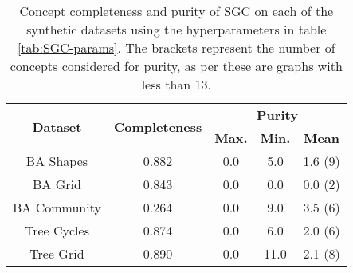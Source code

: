 \begin{table}
    \centering
    \begin{tabular}{c|cccc}
        \multirow{2}{*}{\textbf{Dataset}} &
        \multirow{2}{*}{\textbf{Completeness}} &
        \multicolumn{3}{c}{\textbf{Purity}} \\
        & & \textbf{Max.} & \textbf{Min.} & \textbf{Mean} \\
        \midrule
        BA Shapes       & 0.882 & 0.0 & 5.0 & 1.6 (9)\\
        BA Grid         & 0.843 & 0.0 & 0.0 & 0.0 (2) \\
        BA Community    & 0.264 & 0.0 & 9.0 & 3.5 (6)  \\
        Tree Cycles     & 0.874 & 0.0 & 6.0 & 2.0 (6) \\
        Tree Grid       & 0.890 & 0.0 & 11.0 & 2.1 (8) \\
    \end{tabular}
    \caption{Concept completeness and purity of SGC on each of the synthetic datasets using the hyperparameters in table \ref{tab:SGC-params}. The brackets represent the number of concepts considered for purity, as per  these are graphs with less than 13.}
    \label{tab:GCN-concepts}
\end{table}

